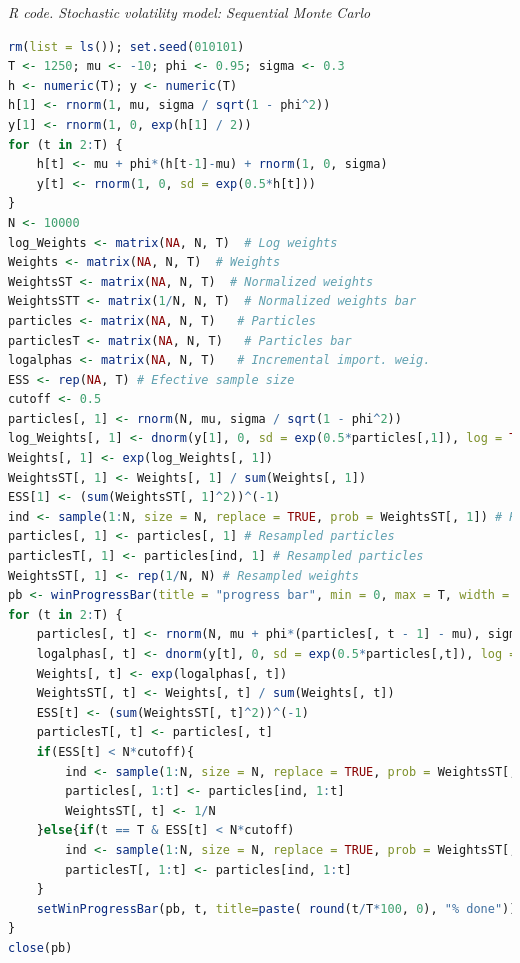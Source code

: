 \begin{enumerate}[leftmargin=*]
\begin{tcolorbox}[enhanced,width=4.67in,center upper,
	fontupper=\large\bfseries,drop shadow southwest,sharp corners]
	\textit{R code. Stochastic volatility model: Sequential Monte Carlo}
	\begin{VF}
		\begin{lstlisting}[language=R]
rm(list = ls()); set.seed(010101)
T <- 1250; mu <- -10; phi <- 0.95; sigma <- 0.3
h <- numeric(T); y <- numeric(T)
h[1] <- rnorm(1, mu, sigma / sqrt(1 - phi^2))  
y[1] <- rnorm(1, 0, exp(h[1] / 2))          
for (t in 2:T) {
	h[t] <- mu + phi*(h[t-1]-mu) + rnorm(1, 0, sigma)
	y[t] <- rnorm(1, 0, sd = exp(0.5*h[t]))
}
N <- 10000
log_Weights <- matrix(NA, N, T)  # Log weights
Weights <- matrix(NA, N, T)  # Weights 
WeightsST <- matrix(NA, N, T)  # Normalized weights 
WeightsSTT <- matrix(1/N, N, T)  # Normalized weights bar 
particles <- matrix(NA, N, T)   # Particles
particlesT <- matrix(NA, N, T)   # Particles bar
logalphas <- matrix(NA, N, T)   # Incremental import. weig.
ESS <- rep(NA, T) # Efective sample size
cutoff <- 0.5
particles[, 1] <- rnorm(N, mu, sigma / sqrt(1 - phi^2)) 
log_Weights[, 1] <- dnorm(y[1], 0, sd = exp(0.5*particles[,1]), log = TRUE)  
Weights[, 1] <- exp(log_Weights[, 1])
WeightsST[, 1] <- Weights[, 1] / sum(Weights[, 1])
ESS[1] <- (sum(WeightsST[, 1]^2))^(-1)
ind <- sample(1:N, size = N, replace = TRUE, prob = WeightsST[, 1]) # Resample 
particles[, 1] <- particles[, 1] # Resampled particles
particlesT[, 1] <- particles[ind, 1] # Resampled particles
WeightsST[, 1] <- rep(1/N, N) # Resampled weights
pb <- winProgressBar(title = "progress bar", min = 0, max = T, width = 300)
for (t in 2:T) {
	particles[, t] <- rnorm(N, mu + phi*(particles[, t - 1] - mu), sigma)  # Sample from proposal
	logalphas[, t] <- dnorm(y[t], 0, sd = exp(0.5*particles[,t]), log = TRUE) 
	Weights[, t] <- exp(logalphas[, t])
	WeightsST[, t] <- Weights[, t] / sum(Weights[, t])
	ESS[t] <- (sum(WeightsST[, t]^2))^(-1)
	particlesT[, t] <- particles[, t]
	if(ESS[t] < N*cutoff){
		ind <- sample(1:N, size = N, replace = TRUE, prob = WeightsST[, t])
		particles[, 1:t] <- particles[ind, 1:t]
		WeightsST[, t] <- 1/N
	}else{if(t == T & ESS[t] < N*cutoff)
		ind <- sample(1:N, size = N, replace = TRUE, prob = WeightsST[, t])
		particlesT[, 1:t] <- particles[ind, 1:t]
	}
	setWinProgressBar(pb, t, title=paste( round(t/T*100, 0), "% done"))
}
close(pb)
\end{lstlisting}
	\end{VF}
\end{tcolorbox} 


\end{enumerate}
